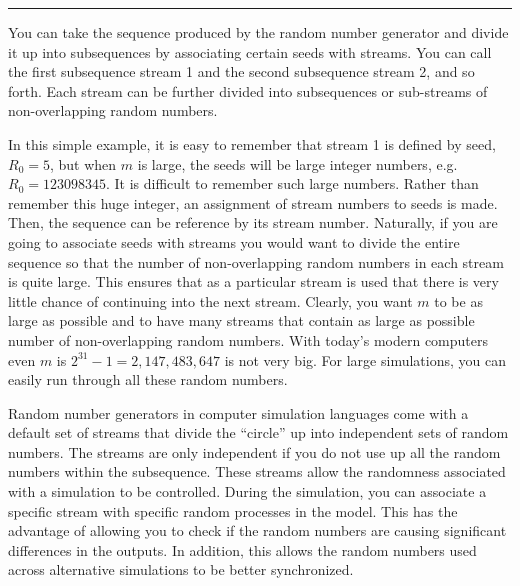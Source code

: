 \documentclass[
]{book}
\theoremstyle{definition}
\theoremstyle{definition}
\theoremstyle{definition}
\theoremstyle{definition}
\theoremstyle{remark}
\begin{document}
\begin{center}\rule{0.5\linewidth}{0.5pt}\end{center}

You can take the sequence produced by the random number generator and
divide it up into subsequences by associating certain seeds with
streams. You can call the first subsequence stream 1 and the second
subsequence stream 2, and so forth. Each stream can be further divided
into subsequences or sub-streams of non-overlapping random numbers.

In this simple example, it is easy to remember that stream 1 is defined
by seed, \(R_{0} = 5\), but when \(m\) is large, the seeds will be large
integer numbers, e.g.~\(R_{0} = 123098345\). It is difficult to remember
such large numbers. Rather than remember this huge integer, an
assignment of stream numbers to seeds is made. Then, the sequence can be
reference by its stream number. Naturally, if you are going to associate
seeds with streams you would want to divide the entire sequence so that
the number of non-overlapping random numbers in each stream is quite
large. This ensures that as a particular stream is used that there is
very little chance of continuing into the next stream. Clearly, you want
\(m\) to be as large as possible and to have many streams that contain as
large as possible number of non-overlapping random numbers. With today's
modern computers even \(m\) is \(2^{31} - 1 = 2,147,483,647\) is not very
big. For large simulations, you can easily run through all these random
numbers.

Random number generators in computer simulation languages come with a
default set of streams that divide the ``circle'' up into independent sets
of random numbers. The streams are only independent if you do not use up
all the random numbers within the subsequence. These streams allow the
randomness associated with a simulation to be controlled. During the
simulation, you can associate a specific stream with specific random
processes in the model. This has the advantage of allowing you to check
if the random numbers are causing significant differences in the
outputs. In addition, this allows the random numbers used across
alternative simulations to be better synchronized.
\end{document}
